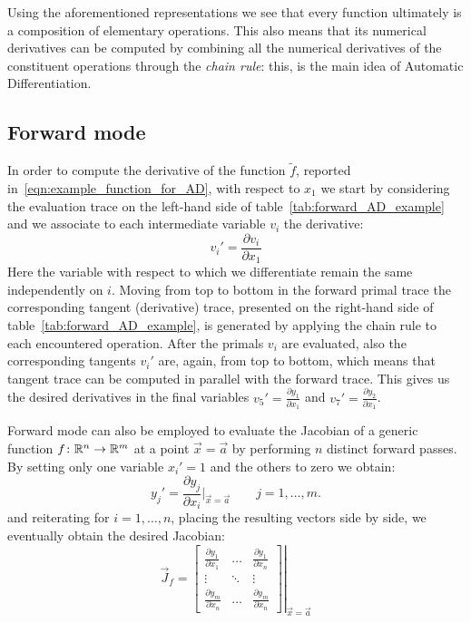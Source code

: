 Using the aforementioned representations we see that every function ultimately is a composition of elementary operations. This also means that its numerical derivatives can be computed by combining all the numerical derivatives of the constituent operations through the \emph{chain rule}: this, is the main idea of Automatic Differentiation.



\subsection{Forward mode}
\label{subsec:forward_mode_AD}

In order to compute the derivative of the function $\tilde{f}$, reported in~\eqref{eqn:example_function_for_AD}, with respect to $x_1$ we start by considering the evaluation trace on the left-hand side of table~\ref{tab:forward_AD_example} and we associate to each intermediate variable $ v_i$ the derivative:
\[
	v_i' = \frac{\partial v_i}{\partial x_1}
\]
Here the variable with respect to which we differentiate remain the same independently on $i$.
Moving from top to bottom in the forward primal trace the corresponding tangent (derivative) trace, presented on the right-hand side of table~\ref{tab:forward_AD_example}, is generated by applying the chain rule to each encountered operation. After the primals $v_i$ are evaluated, also the corresponding tangents $v_i'$ are, again, from top to bottom, which means that tangent trace can be computed in parallel with the forward trace. This gives us the desired derivatives in the final variables $v_5' = \frac{\partial y_1}{\partial x_1}$ and $v_7' = \frac{\partial y_2}{\partial x_1}$.

\medskip
Forward mode can also be employed to evaluate the Jacobian of a generic function $f \colon \mathbb{R}^n \to \mathbb{R}^m$ at a point $\vec{x} = \vec{a}$ by performing $n$ distinct forward passes. By setting only one variable $x_i'=1$ and the others to zero we obtain:
\[
	y_j' = \frac{\partial y_j}{\partial x_i}\bigg|_{\vec{x}=\vec{a}} \qquad j=1,\dots,m.
\]
and reiterating for $i=1,\dots,n$, placing the resulting vectors side by side, we eventually obtain the desired Jacobian:
\[
\vec{J}_f =
\left.
\begin{bmatrix}
	\frac{\partial y_1}{\partial x_1} &  \dots  & \frac{\partial y_1}{\partial x_n}  \\
	\vdots							  & \ddots  & \vdots							 \\
	\frac{\partial y_m}{\partial x_n} &  \dots  & \frac{\partial y_m}{\partial x_n}
\end{bmatrix}
\right|_{\vec{x} = \vec{a}}
\]

